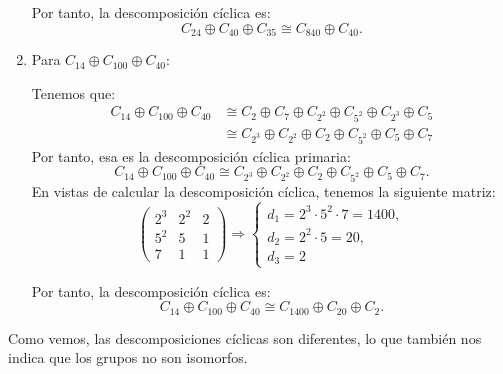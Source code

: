 \begin{ejercicio}
\begin{enumerate}
        Por tanto, la descomposición cíclica es:
        \begin{equation*}
            C_{24} \oplus C_{40} \oplus C_{35} \cong C_{840} \oplus C_{40}.
        \end{equation*}

        \item Para $C_{14} \oplus C_{100} \oplus C_{40}$:
        
        Tenemos que:
        \begin{align*}
            C_{14} \oplus C_{100} \oplus C_{40} &\cong C_{2} \oplus C_7 \oplus C_{2^2} \oplus C_{5^2} \oplus C_{2^3} \oplus C_5 \\
            &\cong C_{2^3}\oplus C_{2^2} \oplus C_2 \oplus C_{5^2} \oplus C_5 \oplus C_7
        \end{align*}
        Por tanto, esa es la descomposición cíclica primaria:
        \begin{equation*}
            C_{14} \oplus C_{100} \oplus C_{40} \cong C_{2^3}\oplus C_{2^2} \oplus C_2 \oplus C_{5^2} \oplus C_5 \oplus C_7.
        \end{equation*}
        En vistas de calcular la descomposición cíclica, tenemos la siguiente matriz:
        \begin{equation*}
            \begin{pmatrix}
                2^3 & 2^2 & 2\\
                5^2 & 5 & 1\\
                7 & 1 & 1
            \end{pmatrix}
            \Longrightarrow
            \left\{
                \begin{array}{l}
                    d_1 = 2^3\cdot 5^2\cdot 7 = 1400, \\
                    d_2 = 2^2\cdot 5 = 20, \\
                    d_3 = 2
                \end{array}
            \right.
        \end{equation*}

        Por tanto, la descomposición cíclica es:
        \begin{equation*}
            C_{14} \oplus C_{100} \oplus C_{40} \cong C_{1400} \oplus C_{20} \oplus C_2.
        \end{equation*}
    \end{enumerate}

    Como vemos, las descomposiciones cíclicas son diferentes, lo que también nos indica que los grupos no son isomorfos.
\end{ejercicio}

